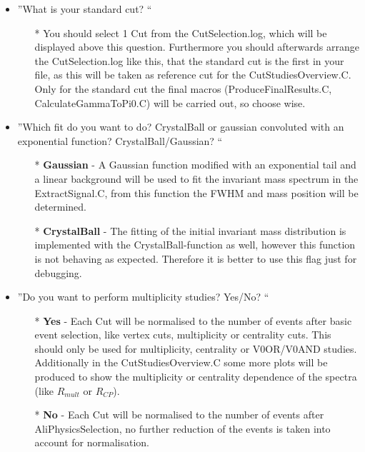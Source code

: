 			\begin{itemize}
			 \item ''What is your standard cut? ``
				\begin{itemize}
				 \item [*] You should select 1 Cut from the CutSelection.log, which will be displayed above this question. Furthermore you should afterwards arrange the CutSelection.log like this, that the standard cut is the first in your file, as this will be taken as reference cut for the CutStudiesOverview.C. Only for the standard cut the final macros (ProduceFinalResults.C, CalculateGammaToPi0.C) will be carried out, so choose wise.
				\end{itemize}
			\item ''Which fit do you want to do? CrystalBall or gaussian convoluted with an exponential function? CrystalBall/Gaussian? ``
				\begin{itemize}
				 	\item [*] \textbf{Gaussian} - A Gaussian function modified with an exponential tail and a linear background will be used to fit the invariant mass spectrum in the ExtractSignal.C, from this function the FWHM and mass position will be determined.
					\item [*] \textbf{CrystalBall} - The fitting of the initial invariant mass distribution is implemented with the CrystalBall-function as well, however this function is not behaving as expected. Therefore it is better to use this flag just for debugging.
				\end{itemize}
			\item ''Do you want to perform multiplicity studies? Yes/No? ``
				\begin{itemize}
				 	\item [*] \textbf{Yes} - Each Cut will be normalised to the number of events after basic event selection, like vertex cuts, multiplicity or centrality cuts. This should only be used for multiplicity, centrality or V0OR/V0AND studies. Additionally in the CutStudiesOverview.C some more plots will be produced to show the multiplicity or centrality dependence of the spectra (like $R_{mult}$ or $R_{CP}$).
					\item [*] \textbf{No} - Each Cut will be normalised to the number of events after AliPhysicsSelection, no further reduction of the events is taken into account for normalisation.  
				\end{itemize}
			\end{itemize}
